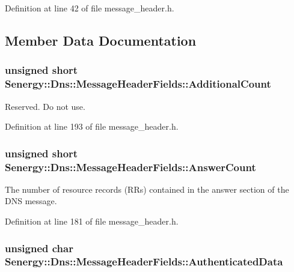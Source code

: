 Definition at line 42 of file message\-\_\-header.\-h.



\subsection{Member Data Documentation}
\hypertarget{struct_senergy_1_1_dns_1_1_message_header_fields_aae6ba21a1c8baa30f0aafe90d165420f}{
\subsubsection[{Additional\-Count}]{\setlength{\rightskip}{0pt plus 5cm}unsigned short Senergy\-::\-Dns\-::\-Message\-Header\-Fields\-::\-Additional\-Count}}\label{struct_senergy_1_1_dns_1_1_message_header_fields_aae6ba21a1c8baa30f0aafe90d165420f}


Reserved. Do not use. 



Definition at line 193 of file message\-\_\-header.\-h.

\hypertarget{struct_senergy_1_1_dns_1_1_message_header_fields_a38e5101ec862c400628d66192c5b9878}{
\subsubsection[{Answer\-Count}]{\setlength{\rightskip}{0pt plus 5cm}unsigned short Senergy\-::\-Dns\-::\-Message\-Header\-Fields\-::\-Answer\-Count}}\label{struct_senergy_1_1_dns_1_1_message_header_fields_a38e5101ec862c400628d66192c5b9878}


The number of resource records (R\-Rs) contained in the answer section of the D\-N\-S message. 



Definition at line 181 of file message\-\_\-header.\-h.

\hypertarget{struct_senergy_1_1_dns_1_1_message_header_fields_a3788cbe9e2663b3be0cad8cbca8dc985}{
\subsubsection[{Authenticated\-Data}]{\setlength{\rightskip}{0pt plus 5cm}unsigned char Senergy\-::\-Dns\-::\-Message\-Header\-Fields\-::\-Authenticated\-Data}}\label{struct_senergy_1_1_dns_1_1_message_header_fields_a3788cbe9e2663b3be0cad8cbca8dc985}


